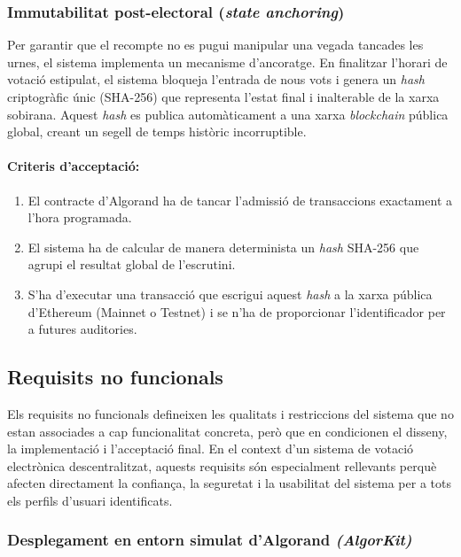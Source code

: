 \subsubsection{Immutabilitat post-electoral (\textit{state anchoring})}

Per garantir que el recompte no es pugui manipular una vegada tancades les urnes, el sistema implementa un mecanisme d'ancoratge. 
En finalitzar l'horari de votació estipulat, el sistema bloqueja l'entrada de nous vots i genera un \textit{hash} criptogràfic únic (SHA-256) que representa l'estat final i inalterable de la xarxa sobirana.
Aquest \textit{hash} es publica automàticament a una xarxa \textit{blockchain} pública global, creant un segell de temps històric incorruptible.

\paragraph{Criteris d'acceptació:}
\begin{enumerate}[label=\roman*.]
    \item El contracte d'Algorand ha de tancar l'admissió de transaccions exactament a l'hora programada.
    \item El sistema ha de calcular de manera determinista un \textit{hash} SHA-256 que agrupi el resultat global de l'escrutini.
    \item S'ha d'executar una transacció que escrigui aquest \textit{hash} a la xarxa pública d'Ethereum (Mainnet o Testnet) i se n'ha de proporcionar l'identificador per a futures auditories.
\end{enumerate}

\subsection{Requisits no funcionals}

Els requisits no funcionals defineixen les qualitats i restriccions del sistema que no estan associades a cap funcionalitat concreta, però que en condicionen el disseny, la implementació i l'acceptació final.
En el context d'un sistema de votació electrònica descentralitzat, aquests requisits són especialment rellevants perquè afecten directament la confiança, la seguretat i la usabilitat del sistema per a tots els perfils d'usuari identificats.

\subsubsection{Desplegament en entorn simulat d'Algorand \textit{(AlgorKit)}}

